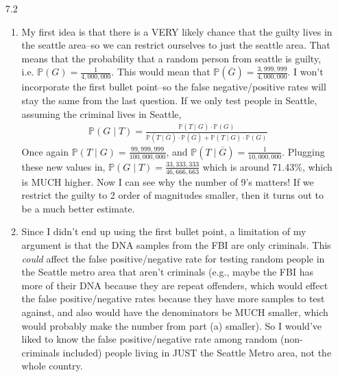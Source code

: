 \documentclass[12pt]{article}
\renewcommand{\P}{\mathbb{P}}
\theoremstyle{definition}
\theoremstyle{remark}
\begin{document}
\begin{enumerate}[leftmargin=\labelsep]
		\item[7.2]
		\begin{enumerate}
			\item  My first idea is that there is a VERY likely chance that the guilty lives in the seattle area--so we can restrict ourselves to just the seattle area. That means that the probability that a random person from seattle is guilty, i.e. $\P(G) = \frac{1}{4,000,000}$. This would mean that $\P(\overline{G}) = \frac{3,999,999}{4,000,000}$. I won't incorporate the first bullet point--so the false negative/positive rates will stay the same from the last question. If we only test people in Seattle, assuming the criminal lives in Seattle,
			\begin{align*}
				\P(G \mid T) = \frac{\P(T \mid G) \cdot \P(G)}{\P(T \mid \overline{G}) \cdot \P(\overline{G}) + \P(T \mid G) \cdot \P(G)}
			\end{align*}
			Once again $\P(T \mid G) = \frac{99,999,999}{100,000,000}$, and $\P(T \mid \overline{G}) = \frac1{10,000,000}$. Plugging these new values in,
			$\P(G \mid T) = \frac{33,333,333}{46,666,663}$ which is around 71.43\%, which is MUCH higher. Now I can see why the number of 9's matters! If we restrict the guilty to 2 order of magnitudes smaller, then it turns out to be a much better estimate.
			
			\item Since I didn't end up using the first bullet point, a limitation of my argument is that the DNA samples from the FBI are only criminals. This \textit{could} affect the false positive/negative rate for testing random people in the Seattle metro area that aren't criminals (e.g., maybe the FBI has more of their DNA because they are repeat offenders, which would effect the false positive/negative rates because they have more samples to test against, and also would have the denominators be MUCH smaller, which would probably make the number from part (a) smaller). So I would've liked to know the false positive/negative rate among random (non-criminals included) people living in JUST the Seattle Metro area, not the whole country.
		\end{enumerate}
	

\end{enumerate}
\end{document}
